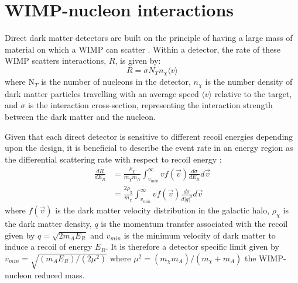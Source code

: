 \section{WIMP-nucleon interactions} \label{sec:wimp_nucleus_interactions}
\iffalse
\par
As WIMPs travel at relative non-relativistic speeds, the recoil energy of the nucleon resulting from an elastic scatter is by only the centre of mass scattering angle, $\theta$ \cite{direct_detection_of_wimps_ref}:
\begin{equation}
    E_{R} = \frac{{\mu}_{N}^{2}\nu_{\chi}^2}{m_{N}}(1-\cos(\theta))
\end{equation}
\fi
Direct dark matter detectors are built on the principle of having a large mass of material on which a WIMP can scatter \cite{direct_detection_of_wimps_ref}.
Within a detector, the rate of these WIMP scatters interactions, $R$, is given by:
\begin{equation}
    R = \sigma N_{T} n_{\chi} \langle v \rangle
    \label{eq:wimp_nucleon_rate}
\end{equation}
where N$_{T}$ is the number of nucleons in the detector, $n_\chi$ is the number density of dark matter particles travelling with an average speed $\langle v \rangle$ relative to the target, and $\sigma$ is the interaction cross-section, representing the interaction strength between the dark matter and the nucleon.
\par
Given that each direct detector is sensitive to different recoil energies depending upon the design, it is beneficial to describe the event rate in an energy region as the differential scattering rate with respect to recoil energy \cite{supersymetry_wimpy_boi_ref}:
\begin{equation}
\begin{split}
    \frac{dR}{dE_R} &= \frac{\rho_{\chi}}{m_\chi m_N} \int^{\infty}_{v_{min}} v f(\vec{v}) \frac{d\sigma}{dE_R} d\vec{v} \\
                    &= \frac{2\rho_{\chi}}{m_\chi} \int^{\infty}_{v_{min}} v f(\vec{v}) \frac{d\sigma}{d |q|^2} d\vec{v}
\end{split}
\label{eq:wimp_differential_rate}
\end{equation}
where $f(\vec{v})$ is the dark matter velocity distribution in the galactic halo, $\rho_{\chi}$ is the dark matter density, $q$ is the momentum transfer associated with the recoil given by $q = \sqrt{2m_A E_R}$ and $v_{min}$ is the minimum velocity of dark matter to induce a recoil of energy $E_R$.
It is therefore a detector specific limit given by $v_{min} = \sqrt{(m_A E_R)/(2\mu^2)}$ where $\mu^2 = (m_\chi m_A)/(m_\chi + m_A)$ the WIMP-nucleon reduced mass.

